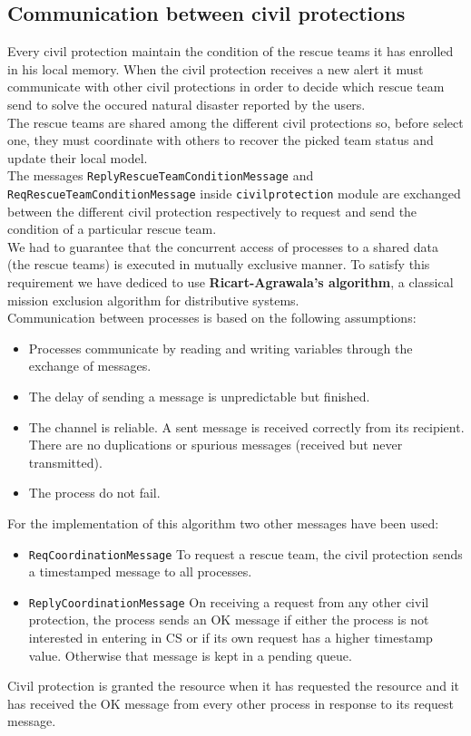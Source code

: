 \documentclass[a4paper,12pt]{report}
\begin{document}
\subsection{Communication between civil protections}
Every civil protection maintain the condition of the rescue teams it has enrolled in his local memory. 
When the civil protection receives a new alert it must communicate with other civil protections in order to decide which rescue team send to solve the occured natural disaster reported by the users.\\
The rescue teams are shared among the different civil protections so, before select one, they must coordinate with others to recover the picked team status and update their local model.\\
The messages \texttt{ReplyRescueTeamConditionMessage} and\\ \texttt{ReqRescueTeamConditionMessage} inside \texttt{civilprotection} module are exchanged between the different civil protection respectively to request and send the condition of a particular rescue team.\\

We had to guarantee that the concurrent access of processes to a shared data (the rescue teams) is executed in mutually exclusive manner.
To satisfy this requirement we have dediced to use \textbf{ Ricart-Agrawala's algorithm}, a classical mission exclusion algorithm for distributive systems.\\

Communication between processes is based on the following assumptions:
\begin{itemize}
\item Processes communicate by reading and writing variables through the exchange of messages.
\item The delay of sending a message is unpredictable but finished.
\item The channel is reliable. A sent message is received correctly from its recipient. There are no duplications or spurious messages (received but never transmitted). 
\item The process do not fail. 
\end{itemize}

For the implementation of this algorithm two other messages have been used:
\begin{itemize}
\item \texttt{ReqCoordinationMessage}
To request a rescue team, the civil protection sends a timestamped message to all processes.
\item \texttt{ReplyCoordinationMessage}
On receiving a request from any other civil protection, the process sends an OK message if either the process is not interested in entering in CS or if its own request has a higher timestamp value. Otherwise that message is kept in a pending queue.
\end{itemize}
Civil protection is granted the resource when it has requested the resource and it has received the OK message from every other
process in response to its request message.\\
\end{document}
